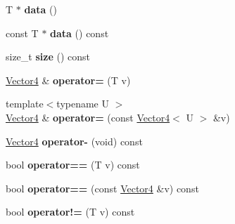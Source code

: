 \begin{DoxyCompactItemize}
\item 
\mbox{\label{struct_p_o_p_1_1_vector4_a24377a734c16bcf7702cd87fbd5b0efd}} 
T $\ast$ {\bfseries data} ()
\item 
\mbox{\label{struct_p_o_p_1_1_vector4_a23b6139794009a9ee0afaa47b58511b7}} 
const T $\ast$ {\bfseries data} () const
\item 
\mbox{\label{struct_p_o_p_1_1_vector4_a1936600600dfac716c3879542e4b91de}} 
size\+\_\+t {\bfseries size} () const
\item 
\mbox{\label{struct_p_o_p_1_1_vector4_a76feb6eb3bd2f0a7dedc06720e7d2f76}} 
\mbox{\hyperlink{struct_p_o_p_1_1_vector4}{Vector4}} \& {\bfseries operator=} (T v)
\item 
\mbox{\label{struct_p_o_p_1_1_vector4_a26d5f205d2d60dc2488a229e8a5e5f80}} 
{\footnotesize template$<$typename U $>$ }\\\mbox{\hyperlink{struct_p_o_p_1_1_vector4}{Vector4}} \& {\bfseries operator=} (const \mbox{\hyperlink{struct_p_o_p_1_1_vector4}{Vector4}}$<$ U $>$ \&v)
\item 
\mbox{\label{struct_p_o_p_1_1_vector4_a12bc7b42442eae434c7e8f30e84b3bfc}} 
\mbox{\hyperlink{struct_p_o_p_1_1_vector4}{Vector4}} {\bfseries operator-\/} (void) const
\item 
\mbox{\label{struct_p_o_p_1_1_vector4_a4e7bfd869d0eceb3dad48dd555775b18}} 
bool {\bfseries operator==} (T v) const
\item 
\mbox{\label{struct_p_o_p_1_1_vector4_a4a0eb4314722aaa0a29e5217d08a5ced}} 
bool {\bfseries operator==} (const \mbox{\hyperlink{struct_p_o_p_1_1_vector4}{Vector4}} \&v) const
\item 
\mbox{\label{struct_p_o_p_1_1_vector4_a26bb288c6af339bd2879995840179f9d}} 
bool {\bfseries operator!=} (T v) const
\item 
\mbox{\label{struct_p_o_p_1_1_vector4_aba9fb65f22a21f804d55d3f03a54f4b5}} 

\end{DoxyCompactItemize}

